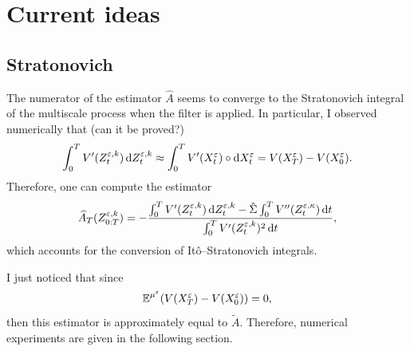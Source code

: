 \documentclass[10pt]{article}
\begin{document}
\section{Current ideas}

\subsection{Stratonovich}
The numerator of the estimator $\hat A$ seems to converge to the Stratonovich integral of the multiscale process when the filter is applied. In particular, I observed numerically that (can it be proved?)
\begin{equation}
	\int_0^T V'(Z^{\varepsilon,k}_t) \,\mathrm{d} Z^{\varepsilon,k}_t \approx \int_0^T V'(X^\varepsilon_t) \circ \mathrm{d} X^\varepsilon_t = V(X_T^\varepsilon) - V(X_0^\varepsilon).
\end{equation}
Therefore, one can compute the estimator 
\begin{equation}
	\widehat A_T (Z^{\varepsilon,k}_{0:T}) = - \frac{\int_0^T V'(Z^{\varepsilon,k}_t) \,\mathrm{d} Z^{\varepsilon,k}_t - \hat \Sigma \int_0^T V''(Z_t^{\varepsilon,\kappa}) \,\mathrm{d} t}{\int_0^T V'(Z^{\varepsilon,k}_t)^2 \,\mathrm{d} t},
\end{equation}
which accounts for the conversion of Itô--Stratonovich integrals. 

\begin{remark} I just noticed that since
	\begin{equation}
		\operatorname{\mathbb{E}}^{\mu^\varepsilon}(V(X_T^\varepsilon) - V(X_0^\varepsilon)) = 0,
	\end{equation}
	then this estimator is approximately equal to $\widetilde A$. Therefore, numerical experiments are given in the following section.
	
\end{remark}
\end{document}
